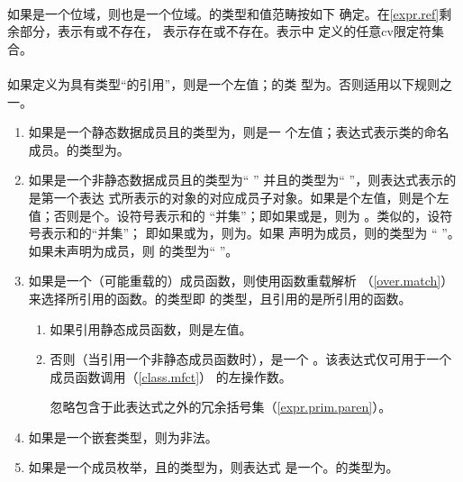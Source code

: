 \paragraph{} %
如果是一个位域，则也是一个位域。的类型和值范畴按如下
确定。在\ref{expr.ref}剩余部分，表示有或不存在，
表示存在或不存在。表示中
定义的任意cv限定符集合。

\paragraph{} %
如果定义为具有类型“的引用”，则是一个左值；的类
型为。否则适用以下规则之一。
\begin{enumerate}
  \item 如果是一个静态数据成员且的类型为，则是一
        个左值；表达式表示类的命名成员。的类型为。
  \item 如果是一个非静态数据成员且的类型为`` ''
        并且的类型为`` ''，则表达式表示的是第一个表达
        式所表示的对象的对应成员子对象。如果是个左值，则是个左
        值；否则是个\xvalue。设符号表示和的
        ``并集''；即如果或是，则为
        。类似的，设符号表示和的``并集''；
        即如果或为，则为。如果
        声明为成员，则的类型为
        `` ''。如果未声明为成员，则
        的类型为``  ''。
  \item 如果是一个（可能重载的）成员函数，则使用函数重载解析
        （\ref{over.match}）来选择所引用的函数。的类型即
        的类型，且引用的是所引用的函数。
        \begin{enumerate}
          \item 如果引用静态成员函数，则是左值。
          \item 否则（当引用一个非静态成员函数时），是一个
                \prvalue。该表达式仅可用于一个成员函数调用（\ref{class.mfct}）
                的左操作数。

                \begin{note}
                  忽略包含于此表达式之外的冗余括号集（\ref{expr.prim.paren}）。
                \end{note}
        \end{enumerate}
  \item 如果是一个嵌套类型，则为非法。
  \item 如果是一个成员枚举，且的类型为，则表达式
        是一个\prvalue。的类型为。
\end{enumerate}

